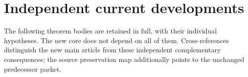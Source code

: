 \section*{Independent current developments}
The following theorem bodies are retained in full, with their individual hypotheses. The new core does not depend on all of them. Cross-references distinguish the new main article from these independent complementary consequences; the source preservation map additionally points to the unchanged predecessor packet.



























